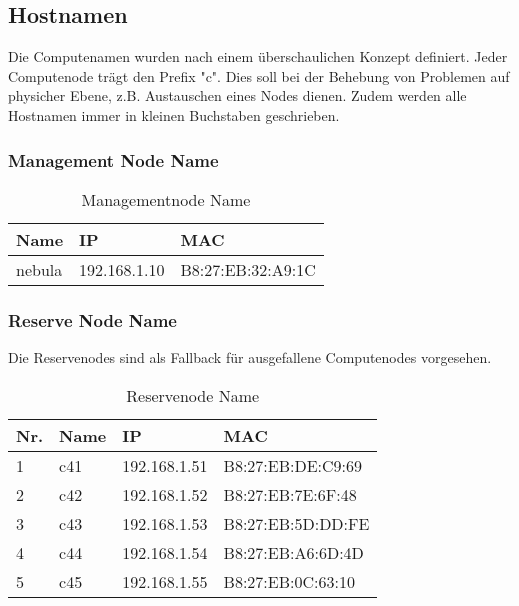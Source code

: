 \subsection{Hostnamen}
Die Computenamen wurden nach einem überschaulichen Konzept definiert. Jeder Computenode trägt den Prefix "c". Dies soll bei der Behebung von Problemen auf physicher Ebene, z.B. Austauschen eines Nodes dienen. Zudem werden alle Hostnamen immer in kleinen Buchstaben geschrieben.

\subsubsection{Management Node Name}
\begin{table}[H]
\centering
\begin{tabular}{p{5cm}p{5.5cm}p{5.5cm}}
\hline
\rowcolor{heading} \textbf{Name} & \textbf{IP} & \textbf{MAC} \\\hline
nebula & 192.168.1.10 & B8:27:EB:32:A9:1C \\\hline
\end{tabular}
\caption{Managementnode Name}
\end{table}

\subsubsection{Reserve Node Name}
Die Reservenodes sind als Fallback für ausgefallene Computenodes vorgesehen.
\begin{table}[H]
\centering
\begin{tabular}{p{1cm}p{2cm}p{6cm}p{6cm}}
\hline
\rowcolor{heading} \textbf{Nr.} & \textbf{Name} & \textbf{IP} & \textbf{MAC} \\\hline
1 & c41 & 192.168.1.51 & B8:27:EB:DE:C9:69 \\\hline
2 & c42 & 192.168.1.52 & B8:27:EB:7E:6F:48 \\\hline
3 & c43 & 192.168.1.53 & B8:27:EB:5D:DD:FE \\\hline
4 & c44 & 192.168.1.54 & B8:27:EB:A6:6D:4D \\\hline
5 & c45 & 192.168.1.55 & B8:27:EB:0C:63:10 \\\hline
\end{tabular}
\caption{Reservenode Name}
\end{table}

